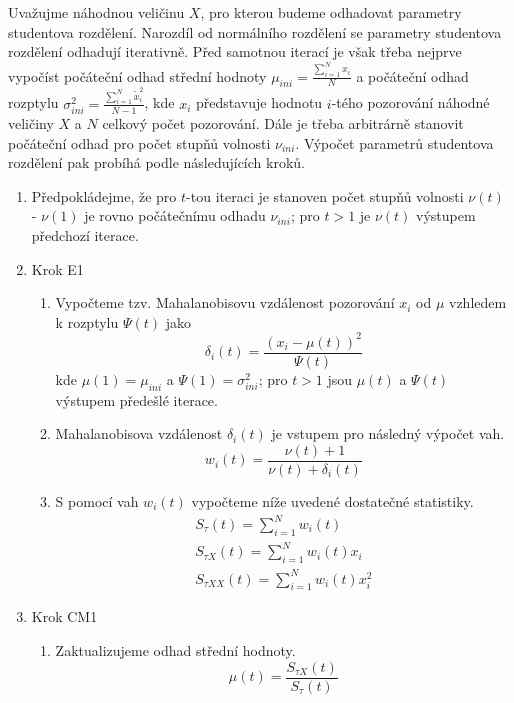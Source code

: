 Uvažujme náhodnou veličinu $X$, pro kterou budeme odhadovat parametry studentova rozdělení. Narozdíl od normálního rozdělení se parametry studentova rozdělení odhadují iterativně. Před samotnou iterací je však třeba nejprve vypočíst počáteční odhad střední hodnoty $\mu_{ini} = \frac{\sum_{i = 1}^N x_i}{N}$ a  počáteční odhad rozptylu $\sigma^2_{ini} = \frac{\sum_{i=1}^N \tilde{x}_i^2}{N - 1}$, kde $x_i$ představuje hodnotu $i$-tého pozorování náhodné veličiny $X$ a $N$ celkový počet pozorování. Dále je třeba arbitrárně stanovit počáteční odhad pro počet stupňů volnosti $\nu_{ini}$. Výpočet parametrů studentova rozdělení pak probíhá podle následujících kroků.
\begin{enumerate}
\item Předpokládejme, že pro $t$-tou iteraci je stanoven počet stupňů volnosti $\nu(t)$ - $\nu(1)$ je rovno počátečnímu odhadu $\nu_{ini}$; pro $t > 1$ je $\nu(t)$ výstupem předchozí iterace.
\item Krok E1
\begin{enumerate}
\item Vypočteme tzv. Mahalanobisovu vzdálenost pozorování $x_i$ od $\mu$ vzhledem k rozptylu $\Psi(t)$ jako
\begin{equation*}
\delta_i(t) = \frac{(x_i - \mu(t))^2}{\Psi(t)}
\end{equation*}
kde $\mu(1) = \mu_{ini}$ a $\Psi(1) = \sigma^2_{ini}$; pro $t > 1$ jsou $\mu(t)$ a $\Psi(t)$ výstupem předešlé iterace.
\item Mahalanobisova vzdálenost $\delta_i(t)$ je vstupem pro následný výpočet vah.
\begin{equation*}
w_{i}(t) = \frac{\nu(t) + 1}{\nu(t) + \delta_i(t)}
\end{equation*}
\item S pomocí vah $w_{i}(t)$ vypočteme níže uvedené dostatečné statistiky.
\begin{gather*}
S_{\tau}(t) = \sum_{i = 1}^N w_i(t)\\
S_{\tau X}(t) = \sum_{i = 1}^N w_i(t)x_i\\
S_{\tau XX}(t) = \sum_{i = 1}^N w_i(t)x_i^2
\end{gather*}
\end{enumerate}
\item Krok CM1
\begin{enumerate}
\item Zaktualizujeme odhad střední hodnoty.
\begin{equation*}
\mu(t) = \frac{S_{\tau X}(t)}{S_{\tau}(t)}
\end{equation*}

\end{enumerate}
\end{enumerate}
